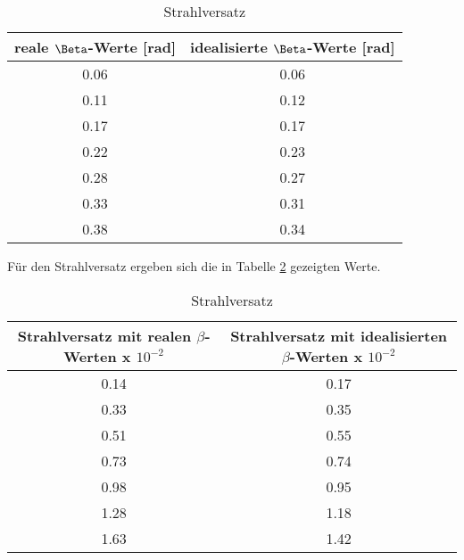   \begin{table}[H]
    \centering
    \caption{Strahlversatz}
    \begin{tabular}{c c }
      \toprule
      reale $\Beta$-Werte [rad] &  idealisierte $\Beta$-Werte [rad]\\
      \midrule
        0.06 & 0.06 \\
        0.11 & 0.12 \\
        0.17 & 0.17 \\
        0.22 & 0.23 \\
        0.28 & 0.27 \\
        0.33 & 0.31 \\
        0.38 & 0.34 \\
      \bottomrule
    \end{tabular}
    \label{tab:beta}
  \end{table}
  \noindent Für den Strahlversatz ergeben sich die in Tabelle \ref{tab:strahlen} gezeigten Werte.
  \begin{table}[H]
    \centering
    \caption{Strahlversatz}
    \begin{tabular}{c c }
      \toprule
      Strahlversatz mit realen $\beta$-Werten x $10^{-2}$ & Strahlversatz mit idealisierten $\beta$-Werten x $10^{-2}$\\
      \midrule
        0.14 & 0.17 \\
        0.33 & 0.35 \\
        0.51 & 0.55   \\
        0.73 & 0.74   \\
        0.98 & 0.95 \\
        1.28 & 1.18   \\
        1.63 & 1.42 \\
      \bottomrule
    \end{tabular}
    \label{tab:strahlen}
  \end{table}

